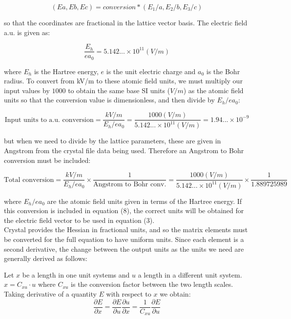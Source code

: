 \documentclass[10pt]{article}
\begin{document}
\begin{equation}
	(Ea, Eb, Ec) = conversion*(E_1/a, E_2/b, E_3/c)
\end{equation}

 so that the coordinates are fractional in the lattice vector basis. The electric field a.u. is given as:

$$\frac{E_h}{ea_0} = 5.142...\times 10^{11} (V/m)$$

where $E_h$ is the Hartree energy, $e$ is the unit electric charge and $a_0$ is the Bohr radius. To convert from kV/m to these atomic field units, we must multiply our input values by $1000$ to obtain the same base SI units ($V/m$) as the atomic field units so that the conversion value is dimensionless, and then divide by $E_h/ea_0$:

$$\text{Input units to a.u. conversion} = \frac{kV/m}{E_h/ea_0} = \frac{1000(V/m)}{5.142...\times 10^{11} (V/m)} = 1.94...\times10^{-9}$$

but when we need to divide by the lattice parameters, these are given in Angstrom from the crystal file data being used. Therefore an Angstrom to Bohr conversion must be included:

$$\text{Total conversion} = \frac{kV/m}{E_h/ea_0}\times\frac{1}{\text{Angstrom to Bohr conv.}} = \frac{1000(V/m)}{5.142...\times 10^{11} (V/m)}\times \frac{1}{1.889725989}$$ 

where ${E_h/ea_0}$ are the atomic field units given in terms of the Hartree energy. If this conversion is included in equation (8), the correct units will be obtained for the electric field vector to be used in equation (3).
\\

Crystal provides the Hessian in fractional units, and so the matrix elements must be converted for the full equation to have uniform units. Since each element is a second derivative, the change between the output units as the units we need are generally derived as follows:

Let $x$ be a length in one unit systems and $u$ a length in a different unit system. $x=C_{xu}\cdot u$ where $C_{xu}$ is the conversion factor between the two length scales. Taking derivative of a quantity $E$ with respect to $x$ we obtain:
$$\frac{\partial E}{\partial x} = \frac{\partial E}{\partial u}\frac{\partial u}{\partial x} = \frac{1}{C_{xu}}\frac{\partial E}{\partial u}$$
\end{document}
